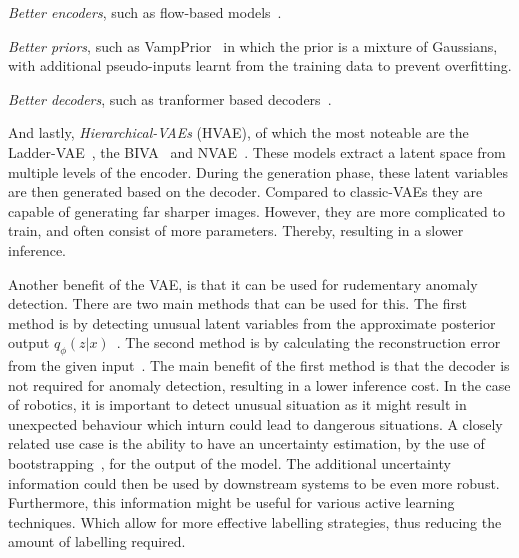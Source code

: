 \emph{Better encoders}, such as flow-based models~\cite{Berg2018SylvesterNF,tomczak2017improving,rezende2015variational}.

\emph{Better priors}, such as VampPrior~\cite{tomczak2018vae} in which the prior is a mixture of Gaussians, with additional pseudo-inputs learnt from the training data to prevent overfitting.

\emph{Better decoders}, such as tranformer based decoders~\cite{Henderson2022AVA,9054554}.

And lastly, \emph{Hierarchical-VAEs} (HVAE), of which the most noteable are the Ladder-VAE~\cite{NIPS2016_6ae07dcb}, the BIVA~\cite{maaloe2019biva} and NVAE~\cite{vahdat2020nvae}. These models extract a latent space from multiple levels of the encoder. During the generation phase, these latent variables are then generated based on the decoder. Compared to classic-VAEs they are capable of generating far sharper images. However, they are more complicated to train, and often consist of more parameters. Thereby, resulting in a slower inference.

Another benefit of the VAE, is that it can be used for rudementary anomaly detection. There are two main methods that can be used for this.
The first method is by detecting unusual latent variables from the approximate posterior output $q_{\phi}(z|x)$~\cite{marimont2020anomalydetectionlatentspace,angiulli2020improving,angiulli2023latent}.
The second method is by calculating the reconstruction error from the given input~\cite{an2015variational, zhou2020unsupervisedanomalylocalizationusing, gouda2022unsupervised}. The main benefit of the first method is that the decoder is not required for anomaly detection, resulting in a lower inference cost. In the case of robotics, it is important to detect unusual situation as it might result in unexpected behaviour which inturn could lead to dangerous situations.
A closely related use case is the ability to have an uncertainty estimation, by the use of bootstrapping~\cite{chen2018use,kohl2018probabilistic}, for the output of the model. The additional uncertainty information could then be used by downstream systems to be even more robust. Furthermore, this information might be useful for various active learning~\cite{hino2020active} techniques. Which allow for more effective labelling strategies, thus reducing the amount of labelling required.

